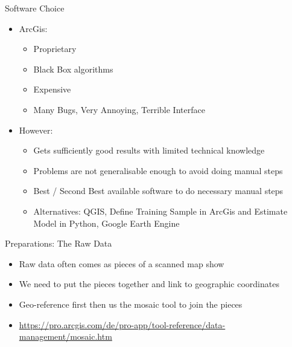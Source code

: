 \begin{frame}{Software Choice}
	\begin{itemize}
		\item ArcGis:
		\begin{itemize}
			\item Proprietary
			\item Black Box algorithms
			\item Expensive
			\item Many Bugs, Very Annoying, Terrible Interface
		\end{itemize}
		\item However:
		\begin{itemize}
			\item Gets sufficiently good results with limited technical knowledge
			\item Problems are not generalisable enough to avoid doing manual steps
			\item Best / Second Best available software to do necessary manual steps
			\item Alternatives: QGIS, Define Training Sample in ArcGis and Estimate Model in Python, Google Earth Engine
		\end{itemize}
	\end{itemize}
	
\end{frame}

\begin{frame}{Preparations: The Raw Data}
	\begin{itemize}
		\item Raw data often comes as pieces of a scanned map \textrightarrow show
		\item We need to put the pieces together and link to geographic coordinates
		\item Geo-reference first then us the mosaic tool to join the pieces
		\item \url{https://pro.arcgis.com/de/pro-app/tool-reference/data-management/mosaic.htm}
	\end{itemize}
\end{frame}


